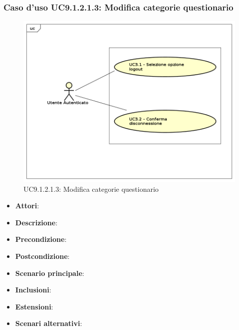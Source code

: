 					\subsubsection{Caso d'uso UC9.1.2.1.3: Modifica categorie questionario}
					\label{UC9.1.2.1.3}
					\begin{figure}[h]
						\centering
					\includegraphics[scale=0.7,keepaspectratio]{UML/UC9.png}
						\caption{UC9.1.2.1.3: Modifica categorie questionario}
					\end{figure}
					\FloatBarrier
					\begin{itemize}
						\item \textbf{Attori}: 
						\item \textbf{Descrizione}: 
						\item \textbf{Precondizione}: 
						\item \textbf{Postcondizione}: 
						\item \textbf{Scenario principale}:
						\item \textbf{Inclusioni}:
						\item \textbf{Estensioni}:
						\item \textbf{Scenari alternativi}:
					\end{itemize}
					
